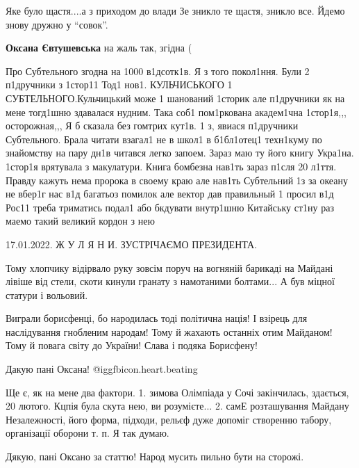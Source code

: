 \begin{itemize}

Яке було щастя....а з приходом до влади Зе зникло те щастя, зникло все. Йдемо знову дружно у \enquote{совок}.

\textbf{Оксана Євтушевська} на жаль так, згідна (


Про Субтельного згодна на 1000 в1дсотк1в. Я з того покол1ння. Були 2 п1дручники
з 1стор11 Тод1 нов1. КУЛЬЧИСЬКОГО 1 СУБТЕЛЬНОГО.Кульчицький може 1 шанований
1сторик але п1дручники як на мене тогд1шню здавалася нудним. Така соб1
пом1ркована академ1чна 1стор1я,,, осторожная,,, Я б сказала без гомтрих кут1в.
1 з, явиася п1дручники Субтельного. Брала читати взагал1 не в школ1 в
б1бл1отец1 техн1куму по знайомству на пару дн1в читався легко запоем. Зараз маю
ту його книгу Укра1на. 1стор1я врятувала з макулатури. Книга бомбезна нав1ть
зараз п1сля 20 л1ття. Правду кажуть нема пророка в своему краю але нав1ть
Субтельний 1з за океану не вбер1г нас в1д багатьоз помилок але вектор дав
правильный 1 просил в1д Рос11 треба триматись подал1 або бкдувати внутр1шню
Китайську ст1ну раз маемо такий великий кордон з нею

17.01.2022. Ж У Л Я Н И. ЗУСТРІЧАЄМО ПРЕЗИДЕНТА.


Тому хлопчику відірвало руку зовсім поруч на вогняній барикаді на Майдані
лівіше від стели, скоти кинули гранату з намотаними болтами... А був міцної
статури і вольовий.


Виграли борисфенці, бо народилась тоді політична нація! І взірець для
наслідування гнобленим народам! Тому й жахають останніх отим Майданом! Тому й
повага світу до України! Слава і подяка Борисфену!

Дакую пані Оксана! @igg{fbicon.heart.beating} 


Ще є, як на мене два фактори. 1. зимова Олімпіада у Сочі закінчилась, здається, 20
лютого. Кцпія була скута нею, ви розумієте... 2. самЕ розташування Майдану
Незалежності, його форма, підходи, рельєф дуже допоміг створенню табору,
організації оборони т. п. Я так думаю.

Дякую, пані Оксано за статтю! Народ мусить пильно бути на сторожі.


\end{itemize} %
